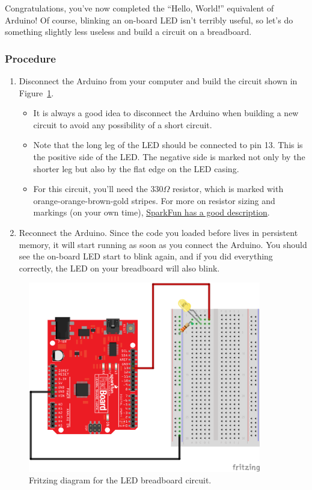 \documentclass[11pt]{article} %
\begin{document}
Congratulations, you’ve now completed the “Hello, World!” equivalent of Arduino! Of course, blinking an on-board LED isn’t terribly useful, so let’s do something slightly less useless and build a circuit on a breadboard.

\subsubsection*{Procedure}

\begin{enumerate}
\item Disconnect the Arduino from your computer and build the circuit shown in Figure~\ref{fig:led}.
\begin{itemize}
    \item It is always a good idea to disconnect the Arduino when building a new circuit to avoid any possibility of a short circuit.
    \item Note that the long leg of the LED should be connected to pin 13. This is the positive side of the LED. The negative side is marked not only by the shorter leg but also by the flat edge on the LED casing.
    \item For this circuit, you'll need the 330$\Omega$ resistor, which is marked with orange-orange-brown-gold stripes. For more on resistor sizing and markings (on your own time), \href{https://learn.sparkfun.com/tutorials/resistors/decoding-resistor-markings}{\underline{SparkFun has a good description}}.
\end{itemize}
\item Reconnect the Arduino. Since the code you loaded before lives in persistent memory, it will start running as soon as you connect the Arduino. You should see the on-board LED start to blink again, and if you did everything correctly, the LED on your breadboard will also blink.
\end{enumerate}

\begin{figure}[htbp]
\begin{center}
\includegraphics[width=4in]{figures/led_fritz.png}
\caption{Fritzing diagram for the LED breadboard circuit. }
\label{fig:led}
\end{center}
\end{figure}
\end{document}
